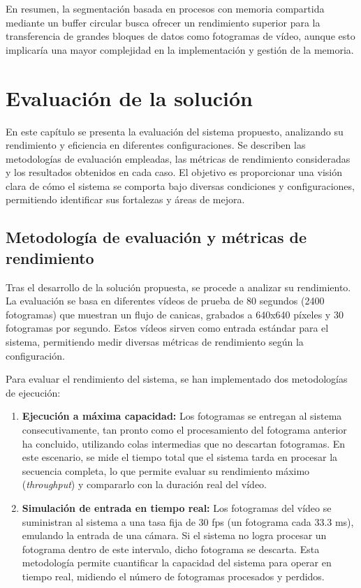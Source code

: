 \documentclass[11pt,spanish,listoffigures,listoftables]{tfgetsinf}
\begin{document}
En resumen, la segmentación basada en procesos con memoria compartida mediante un buffer circular busca ofrecer un rendimiento superior para la transferencia de grandes bloques de datos como fotogramas de vídeo, aunque esto implicaría una mayor complejidad en la implementación y gestión de la memoria.


\chapter{Evaluación de la solución} \label{chap:evaluacion_solucion}

En este capítulo se presenta la evaluación del sistema propuesto, analizando su rendimiento y eficiencia en diferentes configuraciones. Se describen las metodologías de evaluación empleadas, las métricas de rendimiento consideradas y los resultados obtenidos en cada caso. El objetivo es proporcionar una visión clara de cómo el sistema se comporta bajo diversas condiciones y configuraciones, permitiendo identificar sus fortalezas y áreas de mejora.

\section{Metodología de evaluación y métricas de rendimiento} \label{sec:metodologia}

Tras el desarrollo de la solución propuesta, se procede a analizar su rendimiento. La evaluación se basa en diferentes vídeos de prueba de 80 segundos (2400 fotogramas) que muestran un flujo de canicas, grabados a 640x640 píxeles y 30 fotogramas por segundo. Estos vídeos sirven como entrada estándar para el sistema, permitiendo medir diversas métricas de rendimiento según la configuración.

Para evaluar el rendimiento del sistema, se han implementado dos metodologías de ejecución:

\begin{enumerate}
   \item \textbf{Ejecución a máxima capacidad:} Los fotogramas se entregan al sistema consecutivamente, tan pronto como el procesamiento del fotograma anterior ha concluido, utilizando colas intermedias que no descartan fotogramas. En este escenario, se mide el tiempo total que el sistema tarda en procesar la secuencia completa, lo que permite evaluar su rendimiento máximo (\textit{throughput}) y compararlo con la duración real del vídeo.
   \item \textbf{Simulación de entrada en tiempo real:} Los fotogramas del vídeo se suministran al sistema a una tasa fija de 30 fps (un fotograma cada 33.3 ms), emulando la entrada de una cámara. Si el sistema no logra procesar un fotograma dentro de este intervalo, dicho fotograma se descarta. Esta metodología permite cuantificar la capacidad del sistema para operar en tiempo real, midiendo el número de fotogramas procesados y perdidos.
\end{enumerate}
\end{document}
